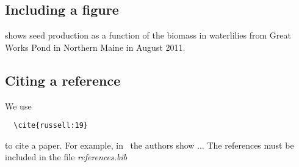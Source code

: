 \subsection{Including a figure}

 shows seed production as a function of the biomass in waterlilies from Great Works Pond in Northern Maine in August 2011.


\subsection{Citing a reference}

We use 
\begin{verbatim}
  \cite{russell:19}
\end{verbatim} 

to cite a paper. For example, in~\cite{russell:19} the authors show \(\ldots{}\) The references must be included in the file \emph{references.bib}
